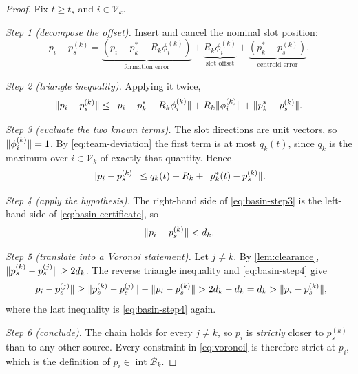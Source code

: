 \documentclass[11pt,a4paper]{article}
\theoremstyle{plain}
\theoremstyle{definition}
\newcommand{\V}{\mathcal{V}}
\DeclarePairedDelimiter{\norm}{\lVert}{\rVert}
\begin{document}
\begin{proof}
Fix $t\geq t_s$ and $i\in\V_k$.

\emph{Step 1 (decompose the offset).} Insert and cancel the nominal slot position:
\begin{equation*}
    p_i-p_s^{(k)}
    =\underbrace{\left(p_i-p_k^*-R_k\phi_i^{(k)}\right)}_{\text{formation error}}
    +\underbrace{R_k\phi_i^{(k)}}_{\text{slot offset}}
    +\underbrace{\left(p_k^*-p_s^{(k)}\right)}_{\text{centroid error}}.
\end{equation*}

\emph{Step 2 (triangle inequality).} Applying it twice,
\begin{equation*}
    \norm{p_i-p_s^{(k)}}
    \leq\norm{p_i-p_k^*-R_k\phi_i^{(k)}}
    +R_k\norm{\phi_i^{(k)}}
    +\norm{p_k^*-p_s^{(k)}}.
\end{equation*}

\emph{Step 3 (evaluate the two known terms).} The slot directions are unit vectors, so
$\norm{\phi_i^{(k)}}=1$. By \eqref{eq:team-deviation} the first term is at most $q_k(t)$, since
$q_k$ is the maximum over $i\in\V_k$ of exactly that quantity. Hence
\begin{equation}\label{eq:basin-step3}
    \norm{p_i-p_s^{(k)}}\leq q_k(t)+R_k+\norm{p_k^*(t)-p_s^{(k)}}.
\end{equation}

\emph{Step 4 (apply the hypothesis).} The right-hand side of \eqref{eq:basin-step3} is the
left-hand side of \eqref{eq:basin-certificate}, so
\begin{equation}\label{eq:basin-step4}
    \norm{p_i-p_s^{(k)}}<d_k.
\end{equation}

\emph{Step 5 (translate into a Voronoi statement).} Let $j\neq k$. By \cref{lem:clearance},
$\norm{p_s^{(k)}-p_s^{(j)}}\geq2d_k$. The reverse triangle inequality and
\eqref{eq:basin-step4} give
\begin{equation*}
    \norm{p_i-p_s^{(j)}}
    \geq\norm{p_s^{(k)}-p_s^{(j)}}-\norm{p_i-p_s^{(k)}}
    >2d_k-d_k
    =d_k
    >\norm{p_i-p_s^{(k)}},
\end{equation*}
where the last inequality is \eqref{eq:basin-step4} again.

\emph{Step 6 (conclude).} The chain holds for every $j\neq k$, so $p_i$ is \emph{strictly}
closer to $p_s^{(k)}$ than to any other source. Every constraint in \eqref{eq:voronoi} is
therefore strict at $p_i$, which is the definition of
$p_i\in\operatorname{int}\mathcal{B}_k$.
\end{proof}
\end{document}
